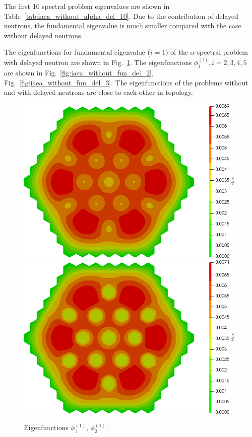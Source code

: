\documentclass[authoryear]{elsarticle}
\begin{document}
The first 10 spectral problem eigenvalues are shown in Table~\ref{tab:iaea_without_alpha_del_10}.
Due to the contribution of delayed neutrons, the fundamental eigenvalue is much smaller compared with the case without delayed neutrons.

The eigenfunctions for fundamental eigenvalue ($i=1$) of the $\alpha$-spectral problem with delayed neutron are shown in Fig.~\ref{fig:iaea_without_fun_del_1}. 
The eigenfunctions $\phi_1^{(i)}, i=2,3,4,5$ are shown in Fig.~\ref{fig:iaea_without_fun_del_2}, Fig.~\ref{fig:iaea_without_fun_del_3}.
The eigenfunctions of the problems without and with delayed neutrons are close to each other in topology.

\begin{figure}[H]
\begin{center}
	\includegraphics[width=0.49\linewidth]{iaea_without/alpha_delayed_sp3_u1_1_without.png}
	\includegraphics[width=0.49\linewidth]{iaea_without/alpha_delayed_sp3_u2_1_without.png}\\
	\caption{Eigenfunctions $\phi_1^{(1)}$, $\phi_2^{(1)}$.}
	\label{fig:iaea_without_fun_del_1}
\end{center}
\end{figure}
\end{document}
